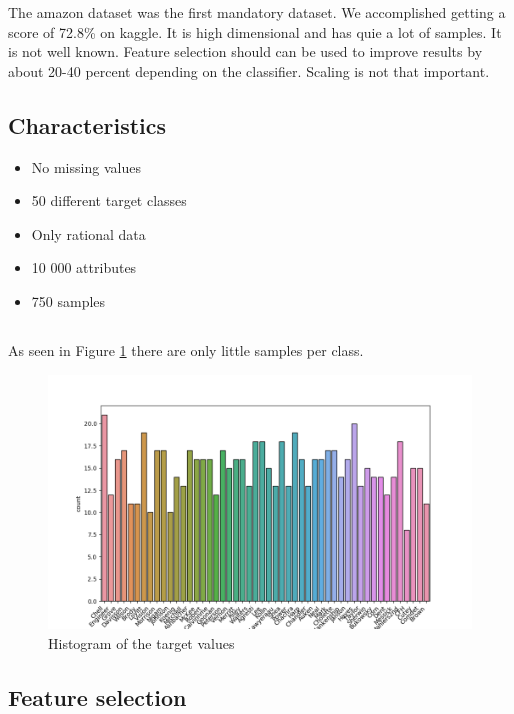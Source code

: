 The amazon dataset was the first mandatory dataset. We accomplished getting a score of 72.8\% on kaggle. It is high dimensional and has quie a lot of samples. It is not well known. Feature selection should can be used to improve results by about 20-40 percent depending on the classifier. Scaling is not that important.

\subsection{Characteristics}

\begin{itemize}
\item No missing values
\item 50 different target classes
\item Only rational data
\item 10 000 attributes
\item 750 samples
\end{itemize}

\subsection{}
As seen in Figure \ref{fig:amazon-target} there are only little samples per class.

\begin{figure}[H]
  \begin{center}
    \includegraphics[width=\linewidth]{amazon/plots/target.png}
    \caption{Histogram of the target values}
    \label{fig:amazon-target}
  \end{center}
\end{figure}


\subsection{Feature selection}

